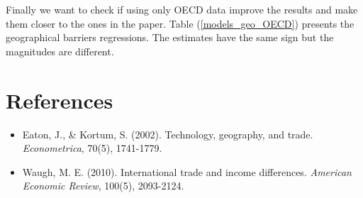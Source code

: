 \documentclass[a4paper,12pt]{article}
\begin{document}
 Finally we want to check if using only OECD data improve the results and make them closer to the ones in the paper. Table (\ref{models_geo_OECD}) presents the geographical barriers regressions. The estimates have the same sign but the magnitudes are different. 
 
 
 
 
 \pagebreak
 
 \section*{References}
  
    \begin{itemize}
        \item Eaton, J., \& Kortum, S. (2002). Technology, geography, and trade. \textit{Econometrica}, 70(5), 1741-1779.
         
        \item Waugh, M. E. (2010). International trade and income differences. \textit{American Economic Review}, 100(5), 2093-2124.
    \end{itemize}
    






    


    

    
    
 
\end{document}
